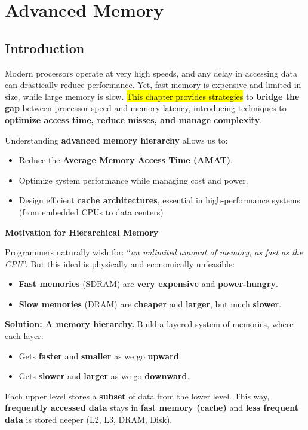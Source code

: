 \section{Advanced Memory}

\subsection{Introduction}

Modern processors operate at very high speeds, and any delay in accessing data can drastically reduce performance. Yet, fast memory is expensive and limited in size, while large memory is slow. \hl{This chapter provides strategies} to \textbf{bridge the gap} between processor speed and memory latency, introducing techniques to \textbf{optimize access time, reduce misses, and manage complexity}.

\highspace
Understanding \textbf{advanced memory hierarchy} allows us to:
\begin{itemize}
    \item Reduce the \textbf{Average Memory Access Time (AMAT)}.
    \item Optimize system performance while managing cost and power.
    \item Design efficient \textbf{cache architectures}, essential in high-performance systems (from embedded CPUs to data centers)
\end{itemize}

\highspace
\begin{flushleft}
    \textcolor{Red2}{ \textbf{Motivation for Hierarchical Memory}}
\end{flushleft}
Programmers naturally wish for: ``\emph{an unlimited amount of memory, as  fast as the CPU}''. But this ideal is physically and economically unfeasible:
\begin{itemize}
    \item \textbf{Fast memories} (SDRAM) are \textbf{very expensive} and \textbf{power-hungry}.
    \item \textbf{Slow memories} (DRAM) are \textbf{cheaper} and \textbf{larger}, but much \textbf{slower}.
\end{itemize}
\textcolor{Green3}{ \textbf{Solution: A memory hierarchy.}} Build a layered system of memories, where each layer:
\begin{itemize}
    \item Gets \textbf{faster} and \textbf{smaller} as we go \textbf{upward}.
    \item Gets \textbf{slower} and \textbf{larger} as we go \textbf{downward}.
\end{itemize}
Each upper level stores a \textbf{subset} of data from the lower level. This way, \textbf{frequently accessed data} stays in \textbf{fast memory (cache)} and \textbf{less frequent data} is stored deeper (L2, L3, DRAM, Disk).

